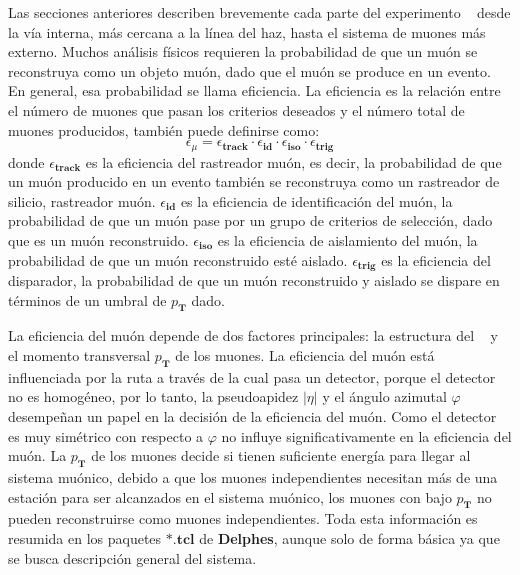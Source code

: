 Las secciones anteriores describen brevemente cada parte del experimento \CMS ~ desde la vía interna, más cercana a la línea del haz, hasta el sistema de muones más externo. Muchos análisis físicos requieren la probabilidad de que un muón se reconstruya como un objeto muón, dado que el muón se produce en un evento. En general, esa probabilidad se llama eficiencia. La eficiencia es la relación entre el número de muones que pasan los criterios deseados y el número total de muones producidos, también puede definirse como:
\begin{equation}
\epsilon_\mu = \epsilon_\mathbf{track} \cdot \epsilon_\mathbf{id} \cdot 
\epsilon_\mathbf{iso} \cdot  \epsilon_\mathbf{trig}
\end{equation}
donde $\epsilon_\mathbf{track}$ es la eficiencia del rastreador muón, es decir, la probabilidad de que un muón producido en un evento también se reconstruya como un rastreador de silicio, rastreador muón. $\epsilon_\mathbf{id}$ es la eficiencia de identificación del muón, la probabilidad de que un muón pase por un grupo de criterios de selección, dado que es un muón reconstruido. $\epsilon_\mathbf{iso}$ es la eficiencia de aislamiento del muón, la probabilidad de que un muón reconstruido esté aislado. $\epsilon_\mathbf{trig}$ es la eficiencia del disparador, la probabilidad de que un muón reconstruido y aislado se dispare en términos de un umbral de $p_\mathbf{T}$ dado.

La eficiencia del muón depende de dos factores principales: la estructura del \CMS ~ y el momento transversal $p_\mathbf{T}$ de los muones. La eficiencia del muón está influenciada por la ruta a través de la cual pasa un detector, porque el detector no es homogéneo, por lo tanto, la pseudoapidez $|\eta|$ y el ángulo azimutal $\varphi$ desempeñan un papel en la decisión de la eficiencia del muón. Como el detector es muy simétrico con respecto a $\varphi$ no influye significativamente en la eficiencia del muón. La $p_\mathbf{T}$ de los muones decide si tienen suficiente energía para llegar al sistema muónico, debido a que los muones independientes necesitan más de una estación para ser alcanzados en el sistema muónico, los muones con bajo $p_\mathbf{T}$ no pueden reconstruirse como muones independientes. Toda esta información es resumida en los paquetes $\mathbf{*.tcl}$ de \textbf{Delphes}, aunque solo de forma básica ya que se busca descripción general del sistema.

